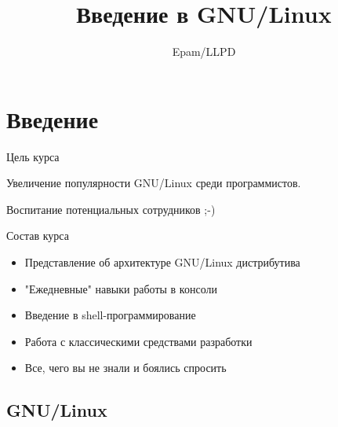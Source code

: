 \documentclass[ignorenonframetext, professionalfonts, hyperref={pdftex, unicode}]{beamer}
\title{Введение в GNU/Linux}
\author{Epam/LLPD}
\begin{document}
\section{Введение}


\frame{
	\frametitle{}
	\titlepage
	\vspace{-0.5cm}
	\begin{center}
	\end{center}
}
\frame{
	\tableofcontents
}








\begin{frame}{Цель курса}
	\begin{center}
		\Huge
		Увеличение популярности GNU/Linux среди программистов.

		\hrulefill

		\normalsize
		Воспитание потенциальных сотрудников ;-)
	\end{center}
\end{frame}


\begin{frame}{Состав курса}
	\begin{itemize}
		\item Представление об архитектуре GNU/Linux дистрибутива
			\pause
		\item "Ежедневные" навыки работы в консоли
			\pause
		\item Введение в shell-программирование
			\pause
		\item Работа с классическими средствами разработки
			\pause
		\item Все, чего вы не знали и боялись спросить
	\end{itemize}
\end{frame}




\subsection{GNU/Linux}
\end{document}
